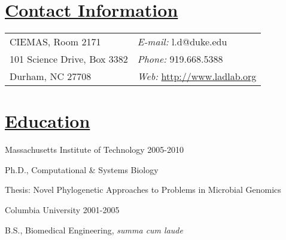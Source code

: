 \documentclass[overlapped,line,11pt]{res}
\newenvironment{list1}{
  \begin{list}{\ding{113}}{%
      \setlength{\itemsep}{0in}
      \setlength{\parsep}{0in} \setlength{\parskip}{0in}
      \setlength{\topsep}{0in} \setlength{\partopsep}{0in} 
      \setlength{\leftmargin}{0.17in}}}{\end{list}}
\begin{document}
\setlength{\pdfpageheight}{\paperheight}
\setlength{\pdfpagewidth}{\paperwidth}


\begin{resume}
\section{\underline{\sc Contact Information}}
\vspace{.05in}
\begin{tabular}{@{}p{4in}p{4in}}

CIEMAS, Room 2171     & {\it E-mail:}    l.d@duke.edu \\                
101 Science Drive, Box 3382   & {\it Phone:} 919.668.5388 \\
Durham, NC 27708 & {\it Web:} \url{http://www.ladlab.org} 

\end{tabular}

\section{\underline{\sc Education}}
\vspace{.05in}
Massachusetts Institute of Technology
\hfill 2005-2010\\

\vspace*{-5mm}
\begin{list1}
\item[] Ph.D., Computational \& Systems Biology
\item[] Thesis: Novel Phylogenetic Approaches to Problems in Microbial Genomics
\end{list1}

\vspace*{-2.5mm}
Columbia University \hfill 2001-2005\\
\vspace*{-5mm}
\begin{list1}
\item[] B.S., Biomedical Engineering, \emph{summa cum laude}
\end{list1}


\end{resume}
\end{document}
